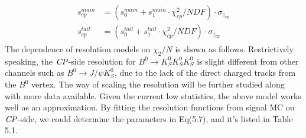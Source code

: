 \begin{eqnarray}
\begin{split}
s_{cp}^{main}&=(s_0^{main} + s_1^{main}\cdot \chi^2_{cp}/NDF )\cdot \sigma_{z_{cp}}\\
s_{cp}^{tail}&=(s_0^{tail} + s_1^{tail}\cdot \chi^2_{cp}/NDF )\cdot \sigma_{z_{cp}}
\end{split}
\end{eqnarray} 
The dependence of resolution models on $\chi_2/N$ is shown as follows. Restrictively speaking, the $\it{CP}$-side resolution for $B^0 \to K_S^0  K_S^0  K_S^0$ is slight different from other channels such as $B^0\to J/\psi K_S^0$, due to the lack of the direct charged tracks from the $B^0$ vertex. The way of scaling the resolution will be further studied along with more data available. Given the current low statistics, the above model works well as an approximation. By fitting the resolution functions from signal MC on $\it{CP}$-side, we could determine the parameters in Eq(5.7), and it's listed in Table 5.1.
